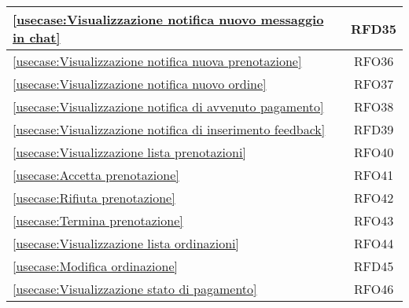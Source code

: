 \begin{longtable}{|l|c|}
	\hline
	\autoref{usecase:Visualizzazione notifica nuovo messaggio in chat}                                                                                           & RFD35                  \\
	\hline
	\autoref{usecase:Visualizzazione notifica nuova prenotazione}                                                                                                & RFO36                  \\
	\hline
	\autoref{usecase:Visualizzazione notifica nuovo ordine}                                                                                                      & RFO37                  \\
	\hline
	\autoref{usecase:Visualizzazione notifica di avvenuto pagamento}                                                                                             & RFO38                  \\
	\hline
	\autoref{usecase:Visualizzazione notifica di inserimento feedback}                                                                                           & RFD39                  \\
	\hline
	\autoref{usecase:Visualizzazione lista prenotazioni}                                                                                                         & RFO40                  \\
	\hline
	\autoref{usecase:Accetta prenotazione}                                                                                                                       & RFO41                  \\
	\hline
	\autoref{usecase:Rifiuta prenotazione}                                                                                                                       & RFO42                  \\
	\hline
	\autoref{usecase:Termina prenotazione}                                                                                                                       & RFO43                  \\
	\hline
	\autoref{usecase:Visualizzazione lista ordinazioni}                                                                                                          & RFO44                  \\
	\hline
	\autoref{usecase:Modifica ordinazione}                                                                                                                       & RFD45                  \\
	\hline
	\autoref{usecase:Visualizzazione stato di pagamento}                                                                                                         & RFO46                  \\

\end{longtable}
